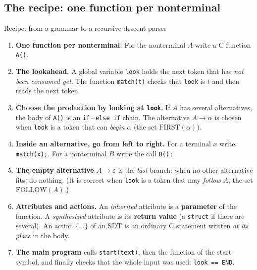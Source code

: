 \documentclass[11pt,a4paper]{article}
\begin{document}
\subsection{The recipe: one function per nonterminal}
\label{sec:rdrecipe}

\begin{defbox}{Recipe: from a grammar to a recursive-descent parser}
\begin{enumerate}[nosep]
\item \textbf{One function per nonterminal.} For the nonterminal $A$ write a C function \texttt{A()}.
\item \textbf{The lookahead.} A global variable \texttt{look} holds the next token that has \emph{not been consumed yet}. The function \texttt{match(t)} checks that \texttt{look} is $t$ and then reads the next token.
\item \textbf{Choose the production by looking at \texttt{look}.} If $A$ has several alternatives, the body of \texttt{A()} is an \texttt{if}\,--\,\texttt{else if} chain. The alternative $A\to\alpha$ is chosen when \texttt{look} is a token that can \emph{begin} $\alpha$ (the set $\mathrm{FIRST}(\alpha)$).
\item \textbf{Inside an alternative, go from left to right.} For a terminal $x$ write \texttt{match(x);}. For a nonterminal $B$ write the call \texttt{B();}.
\item \textbf{The empty alternative $A\to\varepsilon$} is the \emph{last} branch: when no other alternative fits, do nothing. (It is correct when \texttt{look} is a token that may \emph{follow} $A$, the set $\mathrm{FOLLOW}(A)$.)
\item \textbf{Attributes and actions.} An \emph{inherited} attribute is a \textbf{parameter} of the function. A \emph{synthesized} attribute is its \textbf{return value} (a \texttt{struct} if there are several). An action $\{\dots\}$ of an SDT is an ordinary C statement written \emph{at its place} in the body.
\item \textbf{The main program} calls \texttt{start(text)}, then the function of the start symbol, and finally checks that the whole input was used: \texttt{look == END}.
\end{enumerate}
\end{defbox}
\end{document}
